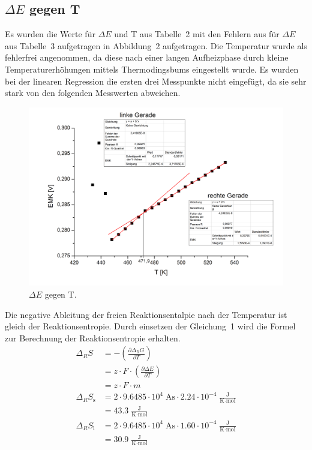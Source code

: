 \documentclass[12pt,a4paper,titlepage,headinclude,bibtotoc]{scrartcl}
\begin{document}
\subsection{$\Delta E$ gegen T}
Es wurden die Werte für $\Delta E$ und T aus Tabelle~2 mit den Fehlern aus für $\Delta E$ aus Tabelle~3 aufgetragen in Abbildung~2 aufgetragen. Die Temperatur wurde als fehlerfrei angenommen, da diese nach einer langen Aufheizphase durch kleine Temperaturerhöhungen mittels Thermodingsbums eingestellt wurde. Es wurden bei der linearen Regression die ersten drei Messpunkte nicht eingefügt, da sie sehr stark von den folgenden Messwerten abweichen. 
\begin{figure}[h]
\includegraphics[width=13.5cm]{EMK_gegen_T.png}
\caption{$\Delta E$ gegen T.}
\end{figure} 
\FloatBarrier
Die negative Ableitung der freien Reaktionsentalpie nach der Temperatur ist gleich der Reaktionsentropie. Durch einsetzen der Gleichung~1 wird die Formel zur Berechnung der Reaktionsentropie erhalten. 
\begin{align}
\Delta_R S &= -(\frac{\partial \Delta_R G}{\partial T})\\
&= z \cdot F \cdot (\frac{\partial \Delta E}{\partial T})\\
&= z \cdot F \cdot m \\
\Delta_R S_{\text{s}} &= 2 \cdot 9.6485 \cdot 10^4\;\text{As} \cdot 2.24 \cdot 10^{-4}\;\frac{\text{J}}{\text{K}\cdot\text{mol}}\\
&= 43.3\;\frac{\text{J}}{\text{K}\cdot\text{mol}}\\
\Delta_R  S_{\text{l}} &= 2 \cdot  9.6485 \cdot 10^4\;\text{As} \cdot 1.60 \cdot 10^{-4}\;\frac{\text{J}}{\text{K}\cdot\text{mol}}  \\
&= 30.9\;\frac{\text{J}}{\text{K}\cdot\text{mol}}
\end{align}
\end{document}

